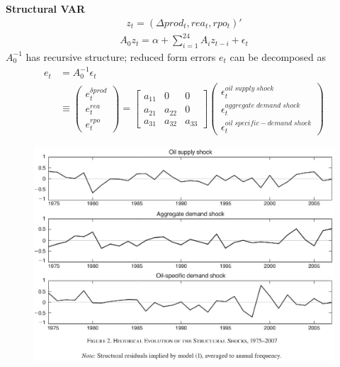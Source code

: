 \documentclass{beamer}
\begin{document}
\begin{frame}
  \textbf{Structural VAR}\\
  \begin{align}
  z_t=(\Delta prod_t, rea_t, rpo_t)'
\end{align}
\begin{align}
  A_0z_t = \alpha + \sum^{24}_{i=1}A_iz_{t-i}+\epsilon_t
\end{align}
\medskip
$A_0^{-1}$ has recursive structure; reduced form errors $e_t$ can be decomposed as
\begin{align}
  e_t&= A^{-1}_0\epsilon_t\\ \nonumber
   &\equiv \begin{pmatrix} e_t^{\delta prod} \\ e_t^ {rea} \\ e_t^{rpo}  \end{pmatrix}
   = \begin{bmatrix}
     a_{11} & 0 & 0\\
     a_{21} & a_{22} & 0\\
     a_{31} & a_{32} & a_{33}
   \end{bmatrix}
   \begin{pmatrix}
     \epsilon_t^{oil\;supply\;shock} \\ \epsilon_t^{aggregate\;demand\;shock} \\ \epsilon_t^{oil\;specific-demand\;shock}
   \end{pmatrix}
\end{align}
\end{frame}

\begin{frame}
  \begin{figure}
    \includegraphics[scale=.7]{killian2.eps}
  \end{figure}
\end{frame}
\end{document}
